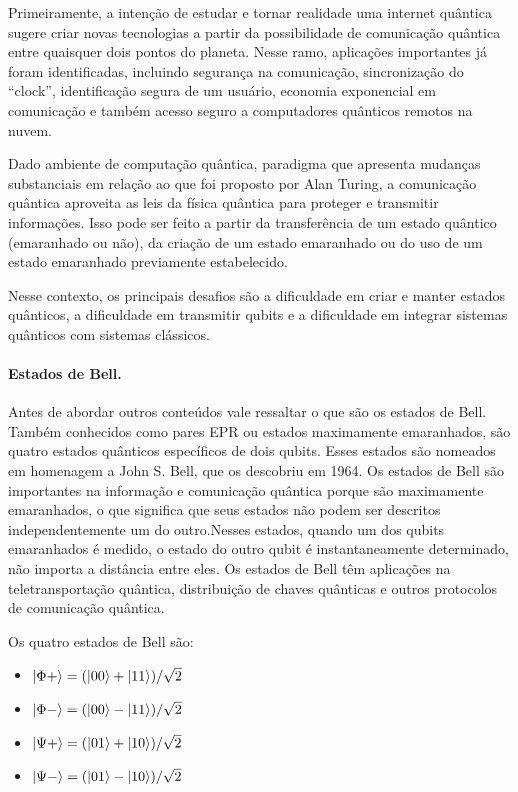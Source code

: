 \documentclass{article}
\begin{document}
        Primeiramente, a intenção de estudar e tornar realidade uma internet quântica sugere criar novas tecnologias a partir da possibilidade de comunicação quântica entre quaisquer dois pontos do planeta. Nesse ramo, aplicações importantes já foram identificadas, incluindo segurança na comunicação, sincronização do ``clock'', identificação segura de um usuário, economia exponencial em comunicação e também acesso seguro a computadores quânticos remotos na nuvem.

        Dado ambiente de computação quântica, paradigma que apresenta mudanças substanciais em relação ao que foi proposto por Alan Turing, a comunicação quântica aproveita as leis da física quântica para proteger e transmitir informações. Isso pode ser feito a partir da transferência de um estado quântico (emaranhado ou não), da criação de um estado emaranhado ou do uso de um estado emaranhado previamente estabelecido. 

        Nesse contexto, os principais desafios são a dificuldade em criar e manter estados quânticos, a dificuldade em transmitir qubits e a dificuldade em integrar sistemas quânticos com sistemas clássicos.

        \paragraph{Estados de Bell.}
        Antes de abordar outros conteúdos vale ressaltar o que são os estados de Bell. Também conhecidos como pares EPR ou estados maximamente emaranhados, são quatro estados quânticos específicos de dois qubits. Esses estados são nomeados em homenagem a John S. Bell, que os descobriu em 1964. 
        Os estados de Bell são importantes na informação e comunicação quântica porque são maximamente emaranhados, o que significa que seus estados não podem ser descritos independentemente um do outro.Nesses estados, quando um dos qubits emaranhados é medido, o estado do outro qubit é instantaneamente determinado, não importa a distância entre eles. Os estados de Bell têm aplicações na teletransportação quântica, distribuição de chaves quânticas e outros protocolos de comunicação quântica.

        Os quatro estados de Bell são:
        \begin{itemize}
            \item $ \ket{\Phi +} = (\ket{00} + \ket{11}) / \sqrt{2}$
            \item $ \ket{\Phi -} = (\ket{00} - \ket{11}) / \sqrt{2}$
            \item $ \ket{\Psi +} = (\ket{01} + \ket{10}) / \sqrt{2}$
            \item $ \ket{\Psi -} = (\ket{01} - \ket{10}) / \sqrt{2}$
        \end{itemize}
       
\end{document}
